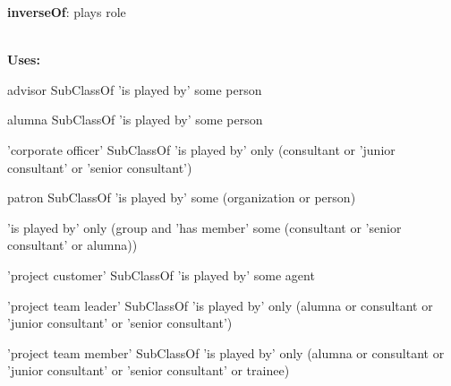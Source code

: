 \documentclass[a4paper, DIV=13, BCOR=0cm]{scrbook}
\begin{document}
\begin{mdframed}[style=onto, frametitle={is played by}]
	{%
		\begin{compactitem}
			\item \textbf{inverseOf}: plays role
		\end{compactitem}
		\hrulefill\\
		\textbf{Uses:}
		\begin{compactitem}
			\item advisor SubClassOf 'is played by' some person
			\item alumna SubClassOf 'is played by' some person
			\item 'corporate officer' SubClassOf 'is played by' only 
			(consultant or 'junior consultant' or 'senior consultant')
			\item patron SubClassOf 'is played by' some 
			(organization or person)
			\item 'is played by' only (group and 'has member' some (consultant or 'senior consultant' or alumna))
			\item 'project customer' SubClassOf 'is played by' some agent
			\item 'project team leader' SubClassOf 'is played by' only 
			(alumna or consultant or 'junior consultant' or 'senior consultant')
			\item 'project team member' SubClassOf 'is played by' only 
			(alumna or consultant or 'junior consultant' or 'senior consultant' or trainee)
		\end{compactitem}
	} %
\end{mdframed}
\end{document}
